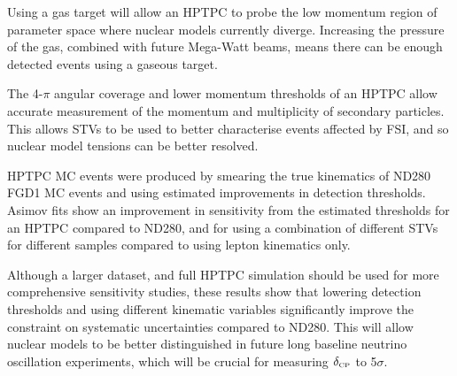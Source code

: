 Using a gas target will allow an HPTPC to probe the low momentum region of parameter space where nuclear models currently diverge. Increasing the pressure of the gas, combined with future Mega-Watt beams, means there can be enough detected events using a gaseous target. 

The 4-$\pi$ angular coverage and lower momentum thresholds of an HPTPC allow accurate measurement of the momentum and multiplicity of secondary particles. This allows STVs to be used to better characterise events affected by FSI, and so nuclear model tensions can be better resolved.

HPTPC MC events were produced by smearing the true kinematics of ND280 FGD1 MC events and using estimated improvements in detection thresholds. Asimov fits show an improvement in sensitivity from the estimated thresholds for an HPTPC compared to ND280, and for using a combination of different STVs for different samples compared to using lepton kinematics only.

Although a larger dataset, and full HPTPC simulation should be used for more comprehensive sensitivity studies, these results show that lowering detection thresholds and using different kinematic variables significantly improve the constraint on systematic uncertainties compared to ND280. This will allow nuclear models to be better distinguished in future long baseline neutrino oscillation experiments, which will be crucial for measuring $\delta_{\scriptscriptstyle\mathrm{CP}}$ to 5$\sigma$.



\newpage
